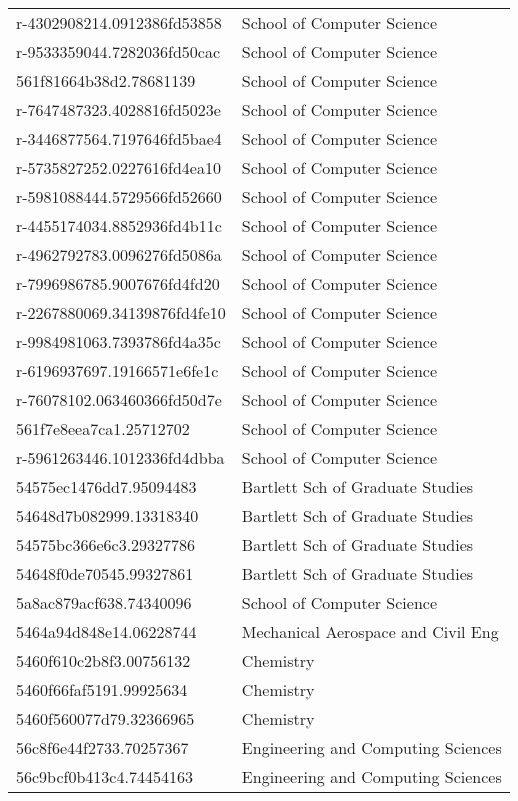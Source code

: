 \begin{tabular}{ll}
r-4302908214.0912386fd53858 & School of Computer Science \\
r-9533359044.7282036fd50cac & School of Computer Science \\
561f81664b38d2.78681139 & School of Computer Science \\
r-7647487323.4028816fd5023e & School of Computer Science \\
r-3446877564.7197646fd5bae4 & School of Computer Science \\
r-5735827252.0227616fd4ea10 & School of Computer Science \\
r-5981088444.5729566fd52660 & School of Computer Science \\
r-4455174034.8852936fd4b11c & School of Computer Science \\
r-4962792783.0096276fd5086a & School of Computer Science \\
r-7996986785.9007676fd4fd20 & School of Computer Science \\
r-2267880069.34139876fd4fe10 & School of Computer Science \\
r-9984981063.7393786fd4a35c & School of Computer Science \\
r-6196937697.19166571e6fe1c & School of Computer Science \\
r-76078102.063460366fd50d7e & School of Computer Science \\
561f7e8eea7ca1.25712702 & School of Computer Science \\
r-5961263446.1012336fd4dbba & School of Computer Science \\
54575ec1476dd7.95094483 & Bartlett Sch of Graduate Studies \\
54648d7b082999.13318340 & Bartlett Sch of Graduate Studies \\
54575bc366e6c3.29327786 & Bartlett Sch of Graduate Studies \\
54648f0de70545.99327861 & Bartlett Sch of Graduate Studies \\
5a8ac879acf638.74340096 & School of Computer Science \\
5464a94d848e14.06228744 & Mechanical Aerospace and Civil Eng \\
5460f610c2b8f3.00756132 & Chemistry \\
5460f66faf5191.99925634 & Chemistry \\
5460f560077d79.32366965 & Chemistry \\
56c8f6e44f2733.70257367 & Engineering and Computing Sciences \\
56c9bcf0b413c4.74454163 & Engineering and Computing Sciences \\

\end{tabular}
